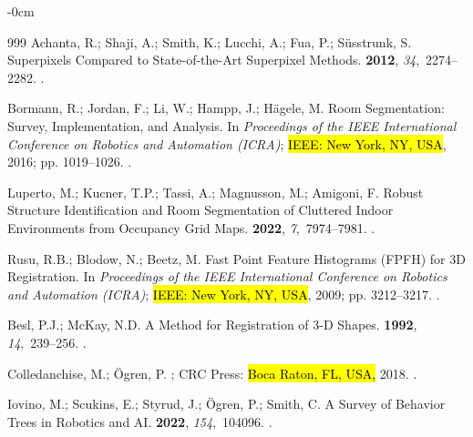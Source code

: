 \documentclass[electronics,article,accept,pdftex,moreauthors]{Definitions/mdpi}
\begin{document}
\begin{adjustwidth}{-\extralength}{0cm}
\begin{thebibliography}{999}
Achanta, R.; Shaji, A.; Smith, K.; Lucchi, A.; Fua, P.; S{\"u}sstrunk, S.
 Superpixels Compared to State-of-the-Art Superpixel Methods.
  {\bf 2012}, {\em 34},~2274--2282.
.

Bormann, R.; Jordan, F.; Li, W.; Hampp, J.; H{\"a}gele, M.
\newblock Room Segmentation: Survey, Implementation, and Analysis.
\newblock In \textit{Proceedings of the IEEE International Conference on Robotics and Automation
  (ICRA)}; \hl{IEEE: New York, NY, USA},  2016; pp. 1019--1026.
.

Luperto, M.; Kucner, T.P.; Tassi, A.; Magnusson, M.; Amigoni, F.
\newblock Robust Structure Identification and Room Segmentation of Cluttered
  Indoor Environments from Occupancy Grid Maps.
 {\bf 2022}, {\em
  7},~7974--7981.
.

Rusu, R.B.; Blodow, N.; Beetz, M.
\newblock Fast Point Feature Histograms ({FPFH}) for {3D} Registration.
\newblock In \textit{Proceedings of the IEEE International Conference on Robotics and Automation
  (ICRA)}; \hl{IEEE: New York, NY, USA},  2009; pp. 3212--3217.
.

Besl, P.J.; McKay, N.D.
\newblock A Method for Registration of {3-D} Shapes.
  {\bf 1992}, {\em 14},~239--256.
.

Colledanchise, M.; {\"O}gren, P.
; CRC
  Press:  \hl{Boca Raton, FL, USA,} 
  2018.
.

Iovino, M.; Scukins, E.; Styrud, J.; {\"O}gren, P.; Smith, C.
\newblock A Survey of Behavior Trees in Robotics and {AI}.
 {\bf 2022}, {\em 154},~104096.
.


\end{thebibliography}
\end{adjustwidth}
\end{document}
